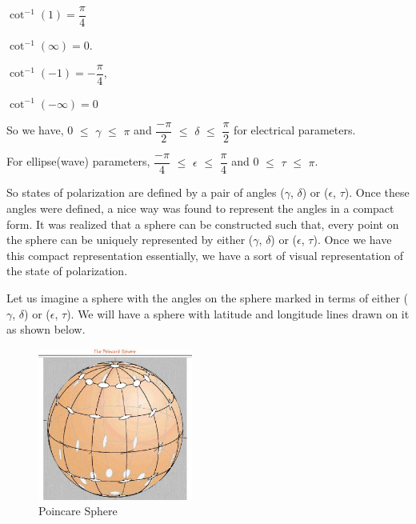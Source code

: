 $\cot^{-1}(1)= \dfrac{\pi}{4}$

$\cot^{-1}(\infty)= 0$.

$\cot^{-1}(-1) = -\dfrac{\pi}{4}$, 

$\cot^{-1}(-\infty) = 0$

So we have,  0 $\leq$ $\gamma$ $\leq$ $\pi$  and $\dfrac{-\pi}{2}$ $\leq$ $\delta$ $\leq$ $\dfrac{\pi}{2}$ for electrical parameters.

For ellipse(wave) parameters, $\dfrac{-\pi}{4}$ $\leq$ $\epsilon$ $\leq$ $\dfrac{\pi}{4}$ and 0 $\leq$ $\tau$ $\leq$ $\pi$.

So states of polarization are defined by a pair of angles ($\gamma$, $\delta$) or ($\epsilon$, $\tau$). Once these angles were defined, a nice way was found to represent the angles in a compact form. It was realized that a sphere can be constructed such that, every point on the sphere can be uniquely represented by either ($\gamma$, $\delta$) or ($\epsilon$, $\tau$). Once we have this compact representation essentially, we have a sort of visual representation of the state of polarization. 

Let us imagine a sphere with the angles on the sphere marked in terms of either ($\gamma$, $\delta$) or ($\epsilon$, $\tau$). We will have a sphere with latitude and longitude lines drawn on it as shown below.
\begin{figure}[h]
\centering
\includegraphics[height=5cm]{./graphics/Poinccare}
\caption{Poincare Sphere}
\label{fig:poinccare}
\end{figure}

